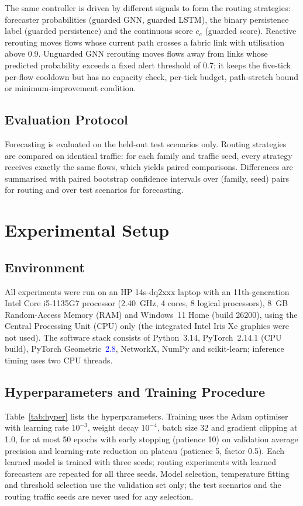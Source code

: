 \documentclass[conference]{IEEEtran}
\newcommand{\chk}[1]{\textcolor{blue}{#1}}
\begin{document}
The same controller is driven by different signals to form the routing strategies: forecaster probabilities (guarded GNN, guarded LSTM), the binary persistence label (guarded persistence) and the continuous score $c_e$ (guarded score). Reactive rerouting moves flows whose current path crosses a fabric link with utilisation above 0.9. Unguarded GNN rerouting moves flows away from links whose predicted probability exceeds a fixed alert threshold of 0.7; it keeps the five-tick per-flow cooldown but has no capacity check, per-tick budget, path-stretch bound or minimum-improvement condition.

\subsection{Evaluation Protocol}
Forecasting is evaluated on the held-out test scenarios only. Routing strategies are compared on identical traffic: for each family and traffic seed, every strategy receives exactly the same flows, which yields paired comparisons. Differences are summarised with paired bootstrap confidence intervals over (family, seed) pairs for routing and over test scenarios for forecasting.

\section{Experimental Setup}
\label{sec:setup}

\subsection{Environment}
All experiments were run on an HP 14s-dq2xxx laptop with an 11th-generation Intel Core i5-1135G7 processor (2.40~GHz, 4 cores, 8 logical processors), 8~GB Random-Access Memory (RAM) and Windows~11 Home (build 26200), using the Central Processing Unit (CPU) only (the integrated Intel Iris Xe graphics were not used). The software stack consists of Python~3.14, PyTorch~2.14.1 (CPU build), PyTorch Geometric~\chk{2.8}, NetworkX, NumPy and scikit-learn; inference timing uses two CPU threads.

\subsection{Hyperparameters and Training Procedure}
Table~\ref{tab:hyper} lists the hyperparameters. Training uses the Adam optimiser with learning rate $10^{-3}$, weight decay $10^{-4}$, batch size 32 and gradient clipping at 1.0, for at most 50 epochs with early stopping (patience 10) on validation average precision and learning-rate reduction on plateau (patience 5, factor 0.5). Each learned model is trained with three seeds; routing experiments with learned forecasters are repeated for all three seeds. Model selection, temperature fitting and threshold selection use the validation set only; the test scenarios and the routing traffic seeds are never used for any selection.
\end{document}
